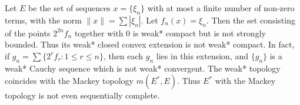 Let $E$ be the set of sequences $x = \{\xi_n\}$ with at most a finite number of non-zero terms, with the norm $\|x\| = \sum |\xi_n|$. Let $f_n(x) = \xi_n$. Then the set consisting of the points $2^{2n}f_n$ together with $0$ is weak* compact but is not strongly bounded. Thus its weak* closed convex extension is not weak* compact. In fact, if $g_n = \sum \{2^r f_r : 1 \leq r \leq n\}$, then each $g_n$ lies in this extension, and $\{g_n\}$ is a weak* Cauchy sequence which is not weak* convergent. The weak* topology coincides with the Mackey topology $m(E^*, E)$. Thus $E^*$ with the Mackey topology is not even sequentially complete.
